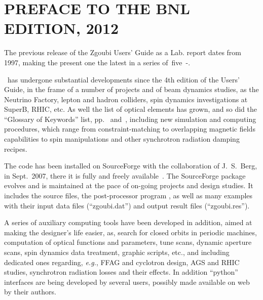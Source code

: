 
      \pagestyle{headings}


                                  \section*{PREFACE TO THE BNL EDITION, 2012} 

The previous release of the Zgoubi Users' Guide as a Lab. report dates from 1997, making the present one  the 
latest in a series of~five~\cite{Biblio1}-\cite{Biblio2c}. 

\bigskip

\noindent \zgoubi\ has undergone substantial developments since the 
4th edition of the Users' Guide,  in the frame of a number of 
projects and of beam dynamics studies, as the Neutrino Factory, lepton and hadron colliders, 
spin dynamics investigations at SuperB, RHIC, etc. 
As well  the list of optical elements has grown, 
and so did the  ``Glossary of Keywords'' list, pp.~\pageref{GOK1A} and~\pageref{GOK1B}, including  new 
simulation and computing procedures, which range from constraint-matching to overlapping magnetic fields capabilities to 
spin manipulations  and other synchrotron radiation damping recipes. 


\bigskip

\noindent The code has been installed on SourceForge with the collaboration of J.~S.~Berg, in Sept.~2007, 
there it is fully and freely available~\cite{SFZ}. The SourceForge package evolves and is maintained at the 
pace of on-going projects and design studies.   It includes the source files, 
the post-processor program \zpop, as well as many examples with their  input 
data files (``zgoubi.dat'') and  output result files (``zgoubi.res''). 


\bigskip

\noindent A series of auxiliary computing tools have been developed in addition, 
 aimed at making the designer's life easier, as, 
 search for closed orbits  in periodic machines, computation of optical functions and parameters, 
tune scans, dynamic aperture scans,   spin dynamics data treatment, 
 graphic scripts, etc., and including dedicated ones regarding, \emph{e.g.}, FFAG and cyclotron design, 
AGS and RHIC studies, synchrotron radiation losses and their effects. 
In addition ``python'' interfaces are being developed by several users,  possibly made available on web 
by their authors. 

